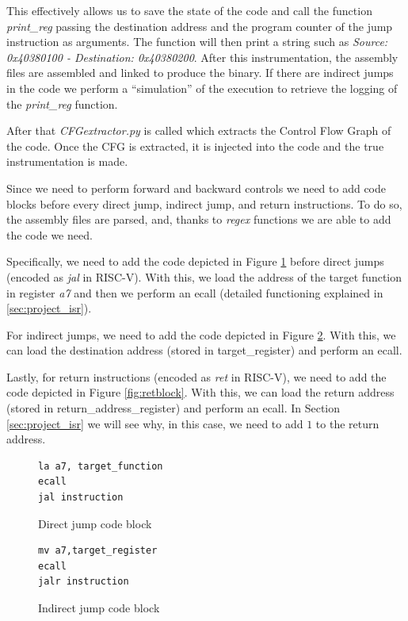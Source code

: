 This effectively allows us to save the state of the code and call the function
\textit{print\_reg} passing the destination address and the program counter of the
jump instruction as arguments. The function will then print a string such as
\textit{Source: 0x40380100 - Destination: 0x40380200}. After this
instrumentation, the assembly files are assembled and linked to produce the binary.
If there are indirect jumps in the code we perform a ``simulation'' of the
execution to retrieve the logging of the \textit{print\_reg} function.

After that \textit{CFGextractor.py} is called which extracts the Control Flow
Graph of the code. Once the CFG is extracted, it is injected into the code and
the true instrumentation is made.

Since we need to perform forward and backward controls we need to add code
blocks before every direct jump, indirect jump, and return instructions. To do so,
the assembly files are parsed, and, thanks to \textit{regex} functions we are able
to add the code we need.

Specifically, we need to add the code depicted in Figure \ref{fig:dirjumpblock}
before direct jumps (encoded as \textit{jal} in RISC-V). With this, we load the address
of the target function in register \textit{a7} and then we perform an ecall (detailed
functioning explained in \ref{sec:project_isr}).

For indirect jumps, we need to add the code depicted in Figure \ref{fig:indirjumpblock}.
With this, we can load the destination address (stored in target\_register) and perform
an ecall.

Lastly, for return instructions (encoded as \textit{ret} in RISC-V), we need to
add the code depicted in Figure \ref{fig:retblock}. With this, we can load the
return address (stored in return\_address\_register) and perform an ecall. In Section
\ref{sec:project_isr} we will see why, in this case, we need to add $1$ to the return
address.

\begin{figure}[htbp]
  \centering
  \begin{lstlisting}[style=Assembly]
la a7, target_function
ecall
jal instruction
 \end{lstlisting}
  \caption{Direct jump code block}
  \label{fig:dirjumpblock}
\end{figure}

\begin{figure}[htbp]
  \centering
  \begin{lstlisting}[style=Assembly]
mv a7,target_register
ecall
jalr instruction
 \end{lstlisting}
  \caption{Indirect jump code block}
  \label{fig:indirjumpblock}
\end{figure}


